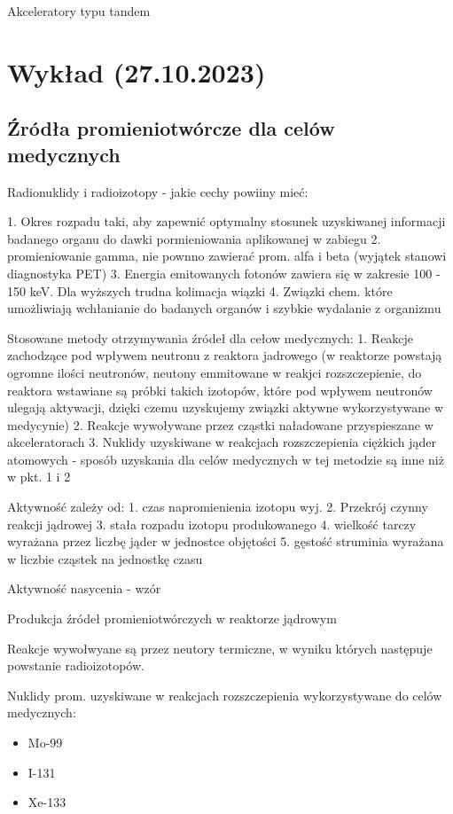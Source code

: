 \documentclass{article}
\begin{document}
Akceleratory typu tandem

\section{Wykład (27.10.2023)}

\subsection{Źródła promieniotwórcze dla celów medycznych}

Radionuklidy i radioizotopy - jakie cechy powiiny mieć:

1. Okres rozpadu taki, aby zapewnić optymalny stosunek uzyskiwanej informacji badanego organu do dawki pormieniowania aplikowanej w zabiegu
2. promieniowanie gamma, nie pownno zawierać prom. alfa i beta (wyjątek stanowi diagnostyka PET)
3. Energia emitowanych fotonów zawiera się w zakresie 100 - 150 keV. Dla wyższych trudna kolimacja wiązki
4. Związki chem. które umożliwiają wchłanianie do badanych organów i szybkie wydalanie z organizmu

Stosowane metody otrzymywania źródeł dla cełow medycznych:
1. Reakcje zachodzące pod wpływem neutronu z reaktora jadrowego (w reaktorze powstają ogromne ilości neutronów, neutony emmitowane w reakjci rozszczepienie, do reaktora wstawiane są próbki takich izotopów, które pod wpływem neutronów ulegają aktywacji, dzięki czemu uzyskujemy związki aktywne wykorzystywane w medycynie)
2. Reakcje wywoływane przez cząstki naładowane przyspieszane w akceleratorach
3. Nuklidy uzyskiwane w reakcjach rozszczepienia ciężkich jąder atomowych - sposób uzyskania dla celów medycznych w tej metodzie są inne niż w pkt. 1 i 2

Aktywność zależy od:
1. czas napromienienia izotopu wyj.
2. Przekrój czynny reakcji jądrowej
3. stała rozpadu izotopu produkowanego
4. wielkość tarczy wyrażana przez liczbę jąder w jednostce objętości
5. gęstość struminia wyrażana w liczbie cząstek na jednostkę czasu

Aktywność nasycenia - wzór

Produkcja źródeł promieniotwórczych w reaktorze jądrowym

Reakcje wywołwyane są przez neutory termiczne, w wyniku których następuje powstanie radioizotopów.

Nuklidy prom. uzyskiwane w reakcjach rozszczepienia wykorzystywane do celów medycznych:
\begin{itemize}
    \item Mo-99
    \item I-131
    \item Xe-133 
\end{itemize}
\end{document}
